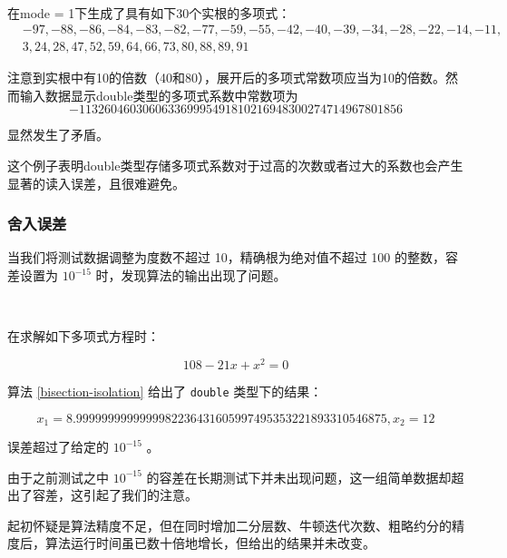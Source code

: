 	\begin{example}[读入误差2]~
		
		在mode = 1下生成了具有如下30个实根的多项式：
		$$
		\begin{aligned}
		& -97,-88,-86,-84,-83,-82,-77,-59,-55,-42,-40,-39,-34,-28,-22,-14,-11, \\
		& 3,24,28,47,52,59,64,66,73,80,88,89,91
		\end{aligned}
		$$
		
		注意到实根中有10的倍数（40和80），展开后的多项式常数项应当为10的倍数。然而输入数据显示double类型的多项式系数中常数项为
		$$
		-113260460306063369995491810216948300274714967801856
		$$ 
		
		显然发生了矛盾。
	
	\end{example}

	这个例子表明double类型存储多项式系数对于过高的次数或者过大的系数也会产生显著的读入误差，且很难避免。

    
    \subsubsection*{舍入误差}

    当我们将测试数据调整为度数不超过 10，精确根为绝对值不超过 100 的整数，容差设置为 $10^{-15}$ 时，发现算法的输出出现了问题。

    \begin{example}[舍入误差]~

        在求解如下多项式方程时：

        \[ 108 -21x +x^2 = 0 \]
        
        算法 \ref{bisection-isolation} 给出了 \verb|double| 类型下的结果：

        \[ x_1 = 8.9999999999999982236431605997495353221893310546875, x_2 = 12\]
        
        误差超过了给定的 $10^{-15}$ 。
        
    \end{example}

	由于之前测试之中 $10^{-15}$ 的容差在长期测试下并未出现问题，这一组简单数据却超出了容差，这引起了我们的注意。
	
	起初怀疑是算法精度不足，但在同时增加二分层数、牛顿迭代次数、粗略约分的精度后，算法运行时间虽已数十倍地增长，但给出的结果并未改变。
	
